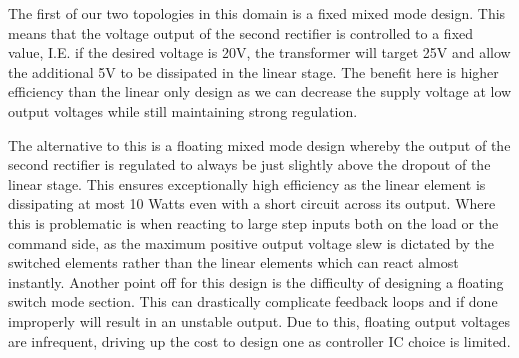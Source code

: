 \documentclass[12pt]{article}
\begin{document}
The first of our two topologies in this domain is a fixed mixed mode design. 
This means that the voltage output of the second rectifier is controlled to a 
fixed value, I.E. if the desired voltage is 20V, the transformer will target 25V 
and allow the additional 5V to be dissipated in the linear stage. The benefit 
here is higher efficiency than the linear only design as we can decrease the supply 
voltage at low output voltages while still maintaining strong regulation. 

The alternative to this is a floating mixed mode design whereby the output of the 
second rectifier is regulated to always be just slightly above the dropout of the 
linear stage. This ensures exceptionally high efficiency as the linear element is 
dissipating at most 10 Watts even with a short circuit across its output. Where this 
is problematic is when reacting to large step inputs both on the load or the command 
side, as the maximum positive output voltage slew is dictated by the switched elements 
rather than the linear elements which can react almost instantly. Another point off 
for this design is the difficulty of designing a floating switch mode section. This 
can drastically complicate feedback loops and if done improperly will result in an 
unstable output. Due to this, floating output voltages are infrequent, driving up 
the cost to design one as controller IC choice is limited.
\end{document}

